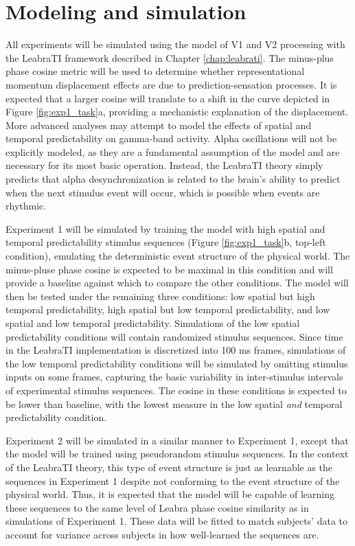 \documentclass[defaultstyle,12pt]{thesis}
\begin{document}
{\section{Modeling and simulation}
All experiments will be simulated using the model of V1 and V2 processing with the LeabraTI framework described in Chapter \ref{chap:leabrati}. The minus-plus phase cosine metric will be used to determine whether representational momentum displacement effects are due to prediction-sensation processes. It is expected that a larger cosine will translate to a shift in the curve depicted in Figure \ref{fig:exp1_task}a, providing a mechanistic explanation of the displacement. More advanced analyses may attempt to model the effects of spatial and temporal predictability on gamma-band activity. Alpha oscillations will not be explicitly modeled, as they are a fundamental assumption of the model and are necessary for its most basic operation. Instead, the LeabraTI theory simply predicts that alpha desynchronization is related to the brain's ability to predict when the next stimulus event will occur, which is possible when events are rhythmic.

Experiment 1 will be simulated by training the model with high spatial and temporal predictability stimulus sequences (Figure \ref{fig:exp1_task}b, top-left condition), emulating the deterministic event structure of the physical world. The minus-pluse phase cosine is expected to be maximal in this condition and will provide a baseline against which to compare the other conditions. The model will then be tested under the remaining three conditions: low spatial but high temporal predictability, high spatial but low temporal predictability, and low spatial and low temporal predictability. Simulations of the low spatial predictability conditions will contain randomized stimulus sequences. Since time in the LeabraTI implementation is discretized into 100 ms frames, simulations of the low temporal predictability conditions will be simulated by omitting stimulus inputs on some frames, capturing the basic variability in inter-stimulus intervals of experimental stimulus sequences. The cosine in these conditions is expected to be lower than baseline, with the lowest measure in the low spatial \textit{and} temporal predictability condition.

Experiment 2 will be simulated in a similar manner to Experiment 1, except that the model will be trained using pseudorandom stimulus sequences. In the context of the LeabraTI theory, this type of event structure is just as learnable as the sequences in Experiment 1 despite not conforming to the event structure of the physical world. Thus, it is expected that the model will be capable of learning these sequences to the same level of Leabra phase cosine similarity as in simulations of Experiment 1. These data will be fitted to match subjects' data to account for variance across subjects in how well-learned the sequences are. 

}
\end{document}
